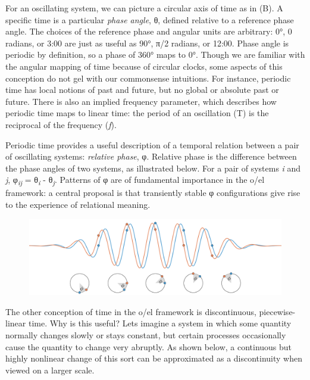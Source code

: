  For an oscillating system, we can picture a circular axis of time as in (B). A specific time is a particular \textit{phase angle}, θ, defined relative to a reference phase angle. The choices of the reference phase and angular units are arbitrary: 0°, 0 radians, or 3:00 are just as useful as 90°, π/2 radians, or 12:00. Phase angle is periodic by definition, so a phase of 360° maps to 0°. Though we are familiar with the angular mapping of time because of circular clocks, some aspects of this conception do not gel with our commonsense intuitions. For instance, periodic time has local notions of past and future, but no global or absolute past or future. There is also an implied frequency parameter, which describes how periodic time maps to linear time: the period of an oscillation (T) is the reciprocal of the frequency (\textit{f}).

  Periodic time provides a useful description of a temporal relation between a pair of oscillating systems: \textit{relative phase}, φ. Relative phase is the difference between the phase angles of two systems, as illustrated below. For a pair of systems \textit{i} and \textit{j}, φ\textit{\textsubscript{ij}}\textsubscript{} = θ\textit{\textsubscript{i}} - θ\textit{\textsubscript{j}}. Patterns of φ are of fundamental importance in the o/el framework: a central proposal is that transiently stable φ configurations give rise to the experience of relational meaning.  

  
\begin{figure}
\includegraphics[width=\textwidth]{figures/Tilsen-img3.png}
\caption{\missingcaption}
\label{fig:}
\end{figure}
 

  The other conception of time in the o/el framework is discontinuous, piecewise-linear time. Why is this useful? Lets imagine a system in which some quantity normally changes slowly or stays constant, but certain processes occasionally cause the quantity to change very abruptly. As shown below, a continuous but highly nonlinear change of this sort can be approximated as a discontinuity when viewed on a larger scale.

